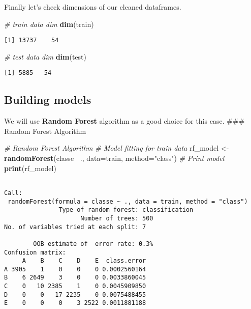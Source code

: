 \documentclass[
  10pt,
  a4paper]{article}
\newenvironment{Shaded}{\begin{snugshade}}{\end{snugshade}}
\newcommand{\CommentTok}[1]{\textcolor[rgb]{0.56,0.35,0.01}{\textit{#1}}}
\newcommand{\DataTypeTok}[1]{\textcolor[rgb]{0.13,0.29,0.53}{#1}}
\newcommand{\KeywordTok}[1]{\textcolor[rgb]{0.13,0.29,0.53}{\textbf{#1}}}
\newcommand{\NormalTok}[1]{#1}
\newcommand{\OperatorTok}[1]{\textcolor[rgb]{0.81,0.36,0.00}{\textbf{#1}}}
\newcommand{\StringTok}[1]{\textcolor[rgb]{0.31,0.60,0.02}{#1}}
\begin{document}
Finally let's check dimensions of our cleaned dataframes.

\begin{Shaded}
\begin{Highlighting}[]
\CommentTok{# train data dim}
\KeywordTok{dim}\NormalTok{(train)}
\end{Highlighting}
\end{Shaded}

\begin{verbatim}
[1] 13737    54
\end{verbatim}

\begin{Shaded}
\begin{Highlighting}[]
\CommentTok{# test data  dim}
\KeywordTok{dim}\NormalTok{(test)}
\end{Highlighting}
\end{Shaded}

\begin{verbatim}
[1] 5885   54
\end{verbatim}

\hypertarget{building-models}{%
\subsection{Building models}\label{building-models}}

We will use \textbf{Random Forest} algorithm as a good choice for this
case. \#\#\# Random Forest Algorithm

\begin{Shaded}
\begin{Highlighting}[]
\CommentTok{# Random Forest Algorithm}
\CommentTok{# Model fitting for train data}
\NormalTok{rf_model <-}\StringTok{ }\KeywordTok{randomForest}\NormalTok{(classe }\OperatorTok{~}\NormalTok{., }\DataTypeTok{data=}\NormalTok{train, }\DataTypeTok{method=}\StringTok{"class"}\NormalTok{)}
\CommentTok{# Print model}
\KeywordTok{print}\NormalTok{(rf_model)}
\end{Highlighting}
\end{Shaded}

\begin{verbatim}

Call:
 randomForest(formula = classe ~ ., data = train, method = "class") 
               Type of random forest: classification
                     Number of trees: 500
No. of variables tried at each split: 7

        OOB estimate of  error rate: 0.3%
Confusion matrix:
     A    B    C    D    E  class.error
A 3905    1    0    0    0 0.0002560164
B    6 2649    3    0    0 0.0033860045
C    0   10 2385    1    0 0.0045909850
D    0    0   17 2235    0 0.0075488455
E    0    0    0    3 2522 0.0011881188
\end{verbatim}
\end{document}
